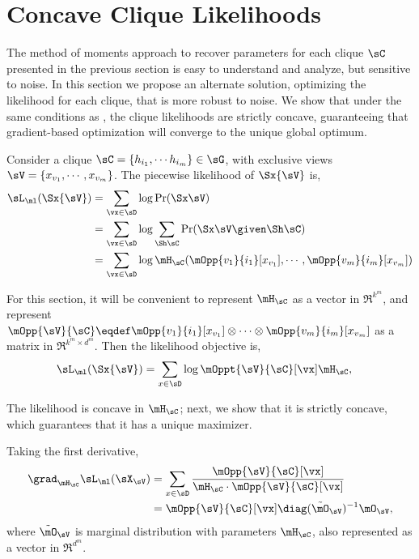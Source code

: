 \section{Concave Clique Likelihoods}
\label{sec:piecewise}

The method of moments approach to recover parameters for each clique
  $\sC$ presented in the previous section is easy to understand and
  analyze, but sensitive to noise. 
In this section we propose an alternate solution, optimizing the 
  likelihood for each clique, that is more robust to noise.
We show that under the same conditions as , the
  clique likelihoods are strictly concave, guaranteeing that
  gradient-based optimization will converge to the unique global
  optimum.

Consider a clique $\sC = \{h_{i_1}, \cdots h_{i_m}\} \in \sG$, with
  exclusive views $\sV = \{x_{v_1}, \cdots, x_{v_m}\}$. 
The piecewise likelihood of $\Sx{\sV}$ is,
\begin{align*}
  \sL_\ml(\Sx{\sV}) 
   &= \sum_{\vx \in \sD} \log \Pr( \Sx \sV ) \\
   &= \sum_{\vx \in \sD} \log \sum_{\Sh \sC} \Pr( \Sx \sV \given \Sh \sC ) \\
   &= \sum_{\vx \in \sD} \log \mH_\sC(\mOpp{v_1}{i_1} [x_{v_1}], \cdots, \mOpp{v_m}{i_m} [x_{v_m}])
\end{align*}

For this section, it will be convenient to represent $\mH_\sC$ as
  a vector in $\Re^{k^m}$, and represent $\mOpp{\sV}{\sC} \eqdef
  \mOpp{v_1}{i_1} [x_{v_1}] \otimes \cdots \otimes
  \mOpp{v_m}{i_m} [x_{v_m}]$ as a matrix in $\Re^{k^m \times
  d^m}$.
Then the likelihood objective is,
\begin{align*}
  \sL_\ml(\Sx{\sV}) 
   &= \sum_{x \in \sD} \log \mOppt{\sV}{\sC}[\vx] \mH_\sC,
\end{align*}

The likelihood is concave in $\mH_\sC$; next, we show that it is
strictly concave, which guarantees that it has a unique maximizer.
  
Taking the first derivative,
\begin{align}
  \grad_{\mH_\sC} \sL_\ml(\sX_\sV) 
  &= \sum_{x \in \sD} \frac{\mOpp{\sV}{\sC}[\vx]}{\mH_\sC \cdot \mOpp{\sV}{\sC}[\vx]} \nonumber \\ 
  &= \mOpp{\sV}{\sC}[\vx] \diag(\tilde \mO_{\sV})^{-1} \mO_{\sV}, \label{eqn:lhood-grad}
\end{align}
where $\tilde \mO_\sV$ is marginal distribution with parameters $\mH_\sC$, also represented as a vector in $\Re^{d^m}$.


